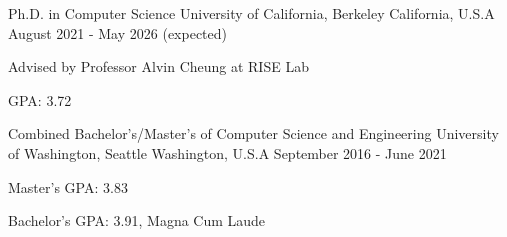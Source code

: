 

\begin{cventries}

  \cventry
    {Ph.D. in Computer Science} %
    {University of California, Berkeley} %
    {California, U.S.A} %
    {August 2021 - May 2026 (expected)} %
    {
      \begin{cvitems} %
        \item {Advised by Professor Alvin Cheung at RISE Lab}
        \item {GPA: 3.72}
      \end{cvitems}
    }
    
  \cventry
    {Combined Bachelor's/Master's of Computer Science and Engineering} %
    {University of Washington, Seattle} %
    {Washington, U.S.A} %
    {September 2016 - June 2021} %
    {
      \begin{cvitems} %
        \item {Master's GPA: 3.83}
        \item {Bachelor's GPA: 3.91, Magna Cum Laude}
      \end{cvitems}
    }

\end{cventries}
